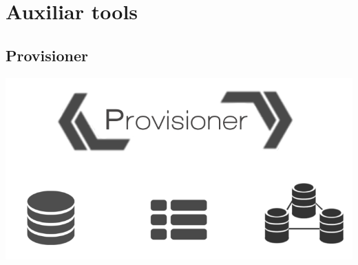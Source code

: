 \section{Auxiliar tools}


\subsection{Provisioner}

\begin{center}
\includegraphics[scale=0.4]{img/graphics/provisioner.png}
\end{center}
